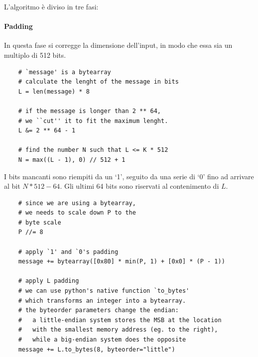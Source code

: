 \documentclass{article}
\begin{document}
L'algoritmo è diviso in tre fasi:

\paragraph{Padding}
In questa fase si corregge la dimensione dell'input, in modo che essa sia un multiplo di 512 bits.
\lstset{language=python}
\begin{lstlisting}
    # `message' is a bytearray
    # calculate the lenght of the message in bits
    L = len(message) * 8

    # if the message is longer than 2 ** 64,
    # we ``cut'' it to fit the maximum lenght.
    L &= 2 ** 64 - 1

    # find the number N such that L <= K * 512
    N = max((L - 1), 0) // 512 + 1
\end{lstlisting}
I bits mancanti sono riempiti da un `1', seguito da una serie di `0' fino ad arrivare al bit $N * 512 - 64$. Gli ultimi 64 bits sono riservati al contenimento di $L$.
\begin{lstlisting}
    # since we are using a bytearray,
    # we needs to scale down P to the
    # byte scale
    P //= 8

    # apply `1' and `0's padding
    message += bytearray([0x80] * min(P, 1) + [0x0] * (P - 1))

    # apply L padding
    # we can use python's native function `to_bytes'
    # which transforms an integer into a bytearray.
    # the byteorder parameters change the endian:
    #   a little-endian system stores the MSB at the location 
    #   with the smallest memory address (eg. to the right),
    #   while a big-endian system does the opposite
    message += L.to_bytes(8, byteorder="little")
\end{lstlisting}
\end{document}
